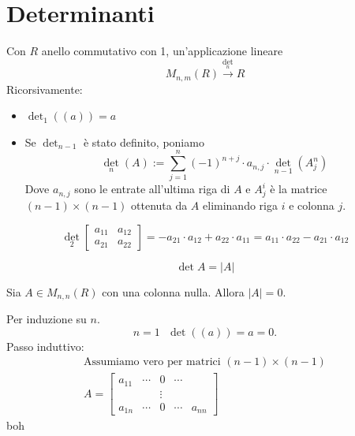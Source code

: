 \section{Determinanti}
\begin{definizione}
    Con $R$ anello commutativo con 1, un'applicazione lineare
    \begin{equation}
        M_{n,m}(R)\xrightarrow{\det_n} R
    \end{equation}
    Ricorsivamente:
    \begin{itemize}
        \item $\det_1((a))=a$
        \item Se $\det_{n - 1}$ è stato definito, poniamo
            \begin{equation}
                \det_n(A) := \sum_{j=1}^{n}(-1)^{n+j}\cdot a_{n,j}\cdot \det_{n-1}(A^n_j)
            \end{equation}
            Dove $a_{n,j}$ sono le entrate all'ultima riga di $A$ e $A^i_j$ è la matrice $(n-1) \times (n-1)$ ottenuta da $A$ eliminando riga $i$ e colonna $j$.
    \end{itemize}
\end{definizione}

\begin{esempio}
    \begin{equation}
        \det_2 \begin{bmatrix}
            a_{11} & a_{12} \\
            a_{21} & a_{22}
        \end{bmatrix} = -a_{21}\cdot a_{12} + a_{22} \cdot a_{11}=a_{11}\cdot a_{22} - a_{21}\cdot a_{12}
    \end{equation}
\end{esempio}

\begin{notazione}
    \begin{equation}
        \det A = |A|
    \end{equation}
\end{notazione}

\begin{proprieta}
    Sia $A\in M_{n,n}(R)$ con una colonna nulla. Allora $|A| = 0$.
    \begin{dimostrazione}
        Per induzione su $n$.
        \begin{equation}
            n=1 \ \ \ \det ((a)) = a = 0.
        \end{equation}
        Passo induttivo: \\
        \begin{gather}
            \text{Assumiamo vero per matrici }(n-1) \times (n-1)\\
            A = \begin{bmatrix}
                a_{11} & \cdots & 0 & \cdots \\
                       && \vdots && \\
                a_{1n}& \cdots & 0 & \cdots & a_{nn}
            \end{bmatrix}
        \end{gather}
        boh
    \end{dimostrazione}
\end{proprieta}

